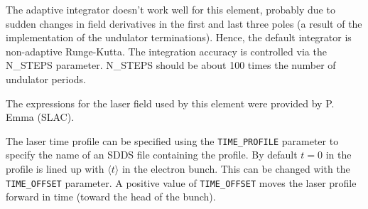 The adaptive integrator doesn't work well for this element, probably
due to sudden changes in field derivatives in the first and last three
poles (a result of the implementation of the undulator terminations).
Hence, the default integrator is non-adaptive Runge-Kutta.  The
integration accuracy is controlled via the N\_STEPS parameter.
N\_STEPS should be about 100 times the number of undulator periods.

The expressions for the laser field used by this element were provided
by P. Emma (SLAC).

The laser time profile can be specified using the \verb|TIME_PROFILE|
parameter to specify the name of an SDDS file containing the
profile.   By default $t=0$ in the
profile is lined up with $\langle t \rangle$ in the electron bunch.
This can be changed with the \verb|TIME_OFFSET| parameter. A positive
value of \verb|TIME_OFFSET| moves the laser profile forward in time (toward
the head of the bunch).
